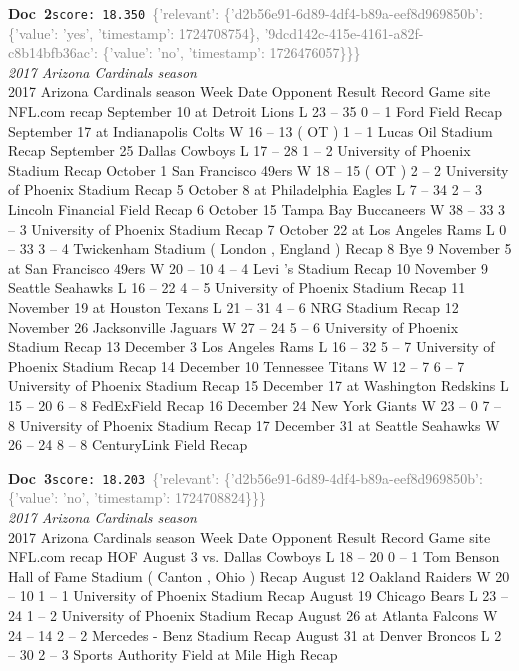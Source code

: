 \documentclass[a4paper,11pt]{article}
\begin{document}
\begin{docenv}
{\footnotesize\textcolor{doccolor}{\textbf{Doc~2}}}\hfill{\tiny\texttt{score:~18.350}}\ {\tiny\textcolor{gray}{\{'relevant': \{'d2b56e91-6d89-4df4-b89a-eef8d969850b': \{'value': 'yes', 'timestamp': 1724708754\}, '9dcd142c-415e-4161-a82f-c8b14bfb36ac': \{'value': 'no', 'timestamp': 1726476057\}\}\}}}\\[3pt]
{\small\textit{2017 Arizona Cardinals season}}\\[2pt]
\vspace{2pt}
{\footnotesize 2017 Arizona Cardinals season
Week Date Opponent Result Record Game site NFL.com recap September 10 at Detroit Lions L 23 -- 35 0 -- 1 Ford Field Recap September 17 at Indianapolis Colts W 16 -- 13 ( OT ) 1 -- 1 Lucas Oil Stadium Recap September 25 Dallas Cowboys L 17 -- 28 1 -- 2 University of Phoenix Stadium Recap October 1 San Francisco 49ers W 18 -- 15 ( OT ) 2 -- 2 University of Phoenix Stadium Recap 5 October 8 at Philadelphia Eagles L 7 -- 34 2 -- 3 Lincoln Financial Field Recap 6 October 15 Tampa Bay Buccaneers W 38 -- 33 3 -- 3 University of Phoenix Stadium Recap 7 October 22 at Los Angeles Rams L 0 -- 33 3 -- 4 Twickenham Stadium ( London , England ) Recap 8 Bye 9 November 5 at San Francisco 49ers W 20 -- 10 4 -- 4 Levi 's Stadium Recap 10 November 9 Seattle Seahawks L 16 -- 22 4 -- 5 University of Phoenix Stadium Recap 11 November 19 at Houston Texans L 21 -- 31 4 -- 6 NRG Stadium Recap 12 November 26 Jacksonville Jaguars W 27 -- 24 5 -- 6 University of Phoenix Stadium Recap 13 December 3 Los Angeles Rams L 16 -- 32 5 -- 7 University of Phoenix Stadium Recap 14 December 10 Tennessee Titans W 12 -- 7 6 -- 7 University of Phoenix Stadium Recap 15 December 17 at Washington Redskins L 15 -- 20 6 -- 8 FedExField Recap 16 December 24 New York Giants W 23 -- 0 7 -- 8 University of Phoenix Stadium Recap 17 December 31 at Seattle Seahawks W 26 -- 24 8 -- 8 CenturyLink Field Recap}
\end{docenv}
\begin{docenv}
{\footnotesize\textcolor{doccolor}{\textbf{Doc~3}}}\hfill{\tiny\texttt{score:~18.203}}\ {\tiny\textcolor{gray}{\{'relevant': \{'d2b56e91-6d89-4df4-b89a-eef8d969850b': \{'value': 'no', 'timestamp': 1724708824\}\}\}}}\\[3pt]
{\small\textit{2017 Arizona Cardinals season}}\\[2pt]
\vspace{2pt}
{\footnotesize 2017 Arizona Cardinals season
Week Date Opponent Result Record Game site NFL.com recap HOF August 3 vs. Dallas Cowboys L 18 -- 20 0 -- 1 Tom Benson Hall of Fame Stadium ( Canton , Ohio ) Recap August 12 Oakland Raiders W 20 -- 10 1 -- 1 University of Phoenix Stadium Recap August 19 Chicago Bears L 23 -- 24 1 -- 2 University of Phoenix Stadium Recap August 26 at Atlanta Falcons W 24 -- 14 2 -- 2 Mercedes - Benz Stadium Recap August 31 at Denver Broncos L 2 -- 30 2 -- 3 Sports Authority Field at Mile High Recap}
\end{docenv}
\end{document}
